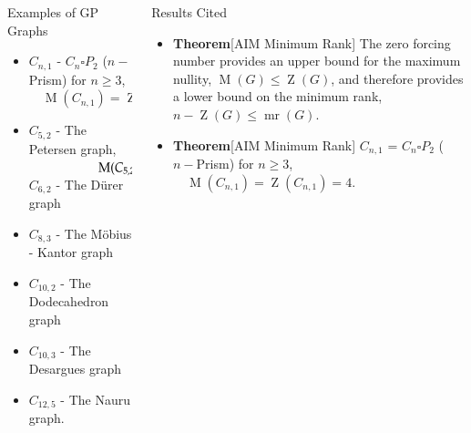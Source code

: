 \documentclass[final]{beamer}
\newcommand{\mr}{\operatorname{mr}}
\newcommand{\M}{\operatorname{M}}
\newcommand{\Z}{\operatorname{Z}}
\newcommand{\A}{\mathcal{A}}
\newcommand{\B}{\mathcal{B}}
\newcommand{\x}{\times}
\newcommand{\bit}{\begin{itemize}}
\newcommand{\eit}{\end{itemize}}
\newcommand{\ben}{\begin{enumerate}}
\newcommand{\een}{\end{enumerate}}
\def\mtx#1{\begin{bmatrix} #1 \end{bmatrix}}
\begin{document}
\begin{frame}{}
\begin{columns}[t]
\begin{column}{0.282\linewidth}
\begin{block} {Examples of GP Graphs}
\bit
\item $C_{n,1}$ -  $C_n \square P_2$ ($n-$Prism) for $n \geq 3$, $\quad\M(C_{n,1}) = \Z(C_{n,1}) = 4$
\item $C_{5,2}$ - The Petersen graph,  $\hspace{1.9cm} \M(C_{5,2}) = \Z(C_{5,2}) = 5$
$C_{6,2}$ - The  D\"{u}rer  graph 
\item $C_{8,3}$ - The M\"{o}bius - Kantor graph 
\item $C_{10,2}$ - The Dodecahedron graph 
\item $C_{10,3}$ - The Desargues graph  
\item $C_{12,5}$ - The Nauru graph.
\eit

\end{block}
    \end{column}%

    \begin{column}{0.48\linewidth}

 

      \begin{block}{Results Cited}
     
      \bit

     \item {\bf Theorem}[AIM Minimum Rank]
The zero forcing number provides an upper bound for the maximum nullity, $\M(G) \leq \Z(G)$, and therefore provides a lower bound on the minimum rank, $n-\Z(G) \leq \mr(G)$. 
     \item {\bf Theorem}[AIM Minimum Rank]
$C_{n,1}$ =  $C_n \square P_2$ ($n-$Prism) for $n \geq 3$, $\quad\M(C_{n,1}) = \Z(C_{n,1}) = 4.$
            \eit
      \end{block}


\end{column}
\end{columns}
\end{frame}
\end{document}
